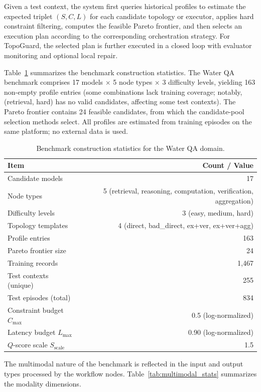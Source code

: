 \documentclass[manuscript,review,anonymous]{acmart}
\begin{document}
Given a test context, the system first queries historical profiles to estimate the expected triplet $(S,C,L)$ for each candidate topology or executor, applies hard constraint filtering, computes the feasible Pareto frontier, and then selects an execution plan according to the corresponding orchestration strategy.
For TopoGuard, the selected plan is further executed in a closed loop with evaluator monitoring and optional local repair.

Table~\ref{tab:benchmark_stats} summarizes the benchmark construction statistics. The Water QA benchmark comprises 17 models $\times$ 5 node types $\times$ 3 difficulty levels, yielding 163 non-empty profile entries (some combinations lack training coverage; notably, (retrieval, hard) has no valid candidates, affecting some test contexts). The Pareto frontier contains 24 feasible candidates, from which the candidate-pool selection methods select. All profiles are estimated from training episodes on the same platform; no external data is used.

\begin{table}[t]
\centering
\caption{Benchmark construction statistics for the Water QA domain.}
\label{tab:benchmark_stats}
\small
\begin{tabular}{lr}
\toprule
\textbf{Item} & \textbf{Count / Value} \\
\midrule
Candidate models & 17 \\
Node types & 5 (retrieval, reasoning, computation, verification, aggregation) \\
Difficulty levels & 3 (easy, medium, hard) \\
Topology templates & 4 (direct, bad\_direct, ex+ver, ex+ver+agg) \\
Profile entries & 163 \\
Pareto frontier size & 24 \\
Training records & 1,467 \\
Test contexts (unique) & 255 \\
Test episodes (total) & 834 \\
Constraint budget $C_{\max}$ & 0.5 (log-normalized) \\
Latency budget $L_{\max}$ & 0.90 (log-normalized) \\
$Q$-score scale $S_{\text{scale}}$ & 1.5 \\
\bottomrule
\end{tabular}
\end{table}

The multimodal nature of the benchmark is reflected in the input and output types processed by the workflow nodes. Table~\ref{tab:multimodal_stats} summarizes the modality dimensions.
\end{document}
